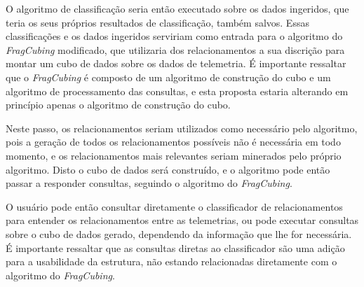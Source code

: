 O algoritmo de classificação seria então executado sobre os dados ingeridos, que teria os seus próprios resultados de classificação, também salvos.
Essas classificações e os dados ingeridos serviriam como entrada para o algoritmo do \textit{FragCubing} modificado, que utilizaria dos relacionamentos a sua discrição para montar um cubo de dados sobre os dados de telemetria.
É importante ressaltar que o \textit{FragCubing} é composto de um algoritmo de construção do cubo e um algoritmo de processamento das consultas, e esta proposta estaria alterando em princípio apenas o algoritmo de construção do cubo.

Neste passo, os relacionamentos seriam utilizados como necessário pelo algoritmo, pois a geração de todos os relacionamentos possíveis não é necessária em todo momento, e os relacionamentos mais relevantes seriam minerados pelo próprio algoritmo.
Disto o cubo de dados será construído, e o algoritmo pode então passar a responder consultas, seguindo o algoritmo do \textit{FragCubing}.

O usuário pode então consultar diretamente o classificador de relacionamentos para entender os relacionamentos entre as telemetrias, ou pode executar consultas sobre o cubo de dados gerado, dependendo da informação que lhe for necessária.
É importante ressaltar que as consultas diretas ao classificador são uma adição para a usabilidade da estrutura, não estando relacionadas diretamente com o algoritmo do \textit{FragCubing}.

